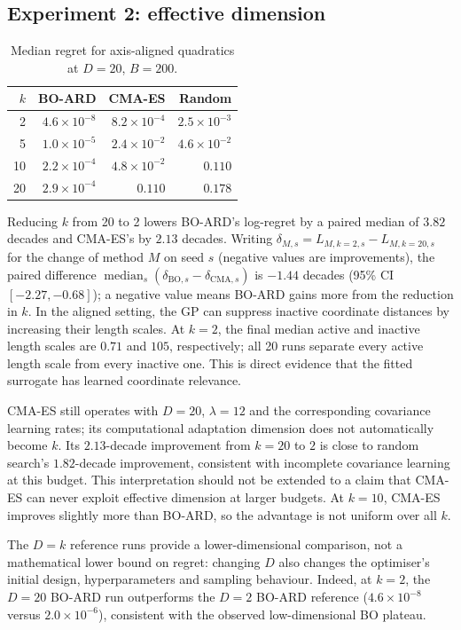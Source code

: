 \documentclass[11pt,a4paper]{article}
\newcommand{\med}{\operatorname{median}}
\begin{document}
\subsection{Experiment 2: effective dimension}
\begin{table}[H]\centering\caption{Median regret for axis-aligned quadratics at $D=20$, $B=200$.}\begin{tabular}{rrrr}\toprule $k$&BO-ARD&CMA-ES&Random\\\midrule 2&$4.6\times10^{-8}$&$8.2\times10^{-4}$&$2.5\times10^{-3}$\\5&$1.0\times10^{-5}$&$2.4\times10^{-2}$&$4.6\times10^{-2}$\\10&$2.2\times10^{-4}$&$4.8\times10^{-2}$&$0.110$\\20&$2.9\times10^{-4}$&$0.110$&$0.178$\\\bottomrule\end{tabular}\end{table}
Reducing $k$ from 20 to 2 lowers BO-ARD's log-regret by a paired median of $3.82$ decades and CMA-ES's by $2.13$ decades. Writing $\delta_{M,s}=L_{M,k=2,s}-L_{M,k=20,s}$ for the change of method $M$ on seed $s$ (negative values are improvements), the paired difference $\med_s(\delta_{\mathrm{BO},s}-\delta_{\mathrm{CMA},s})$ is $-1.44$ decades (95\% CI $[-2.27,-0.68]$); a negative value means BO-ARD gains more from the reduction in $k$. In the aligned setting, the GP can suppress inactive coordinate distances by increasing their length scales. At $k=2$, the final median active and inactive length scales are $0.71$ and $105$, respectively; all 20 runs separate every active length scale from every inactive one. This is direct evidence that the fitted surrogate has learned coordinate relevance.

CMA-ES still operates with $D=20$, $\lambda=12$ and the corresponding covariance learning rates; its computational adaptation dimension does not automatically become $k$. Its $2.13$-decade improvement from $k=20$ to $2$ is close to random search's $1.82$-decade improvement, consistent with incomplete covariance learning at this budget. %
This interpretation should not be extended to a claim that CMA-ES can never exploit effective dimension at larger budgets. At $k=10$, CMA-ES improves slightly more than BO-ARD, so the advantage is not uniform over all $k$.

The $D=k$ reference runs provide a lower-dimensional comparison, not a mathematical lower bound on regret: changing $D$ also changes the optimiser's initial design, hyperparameters and sampling behaviour. Indeed, at $k=2$, the $D=20$ BO-ARD run outperforms the $D=2$ BO-ARD reference ($4.6\times10^{-8}$ versus $2.0\times10^{-6}$), consistent with the observed low-dimensional BO plateau.
\end{document}
